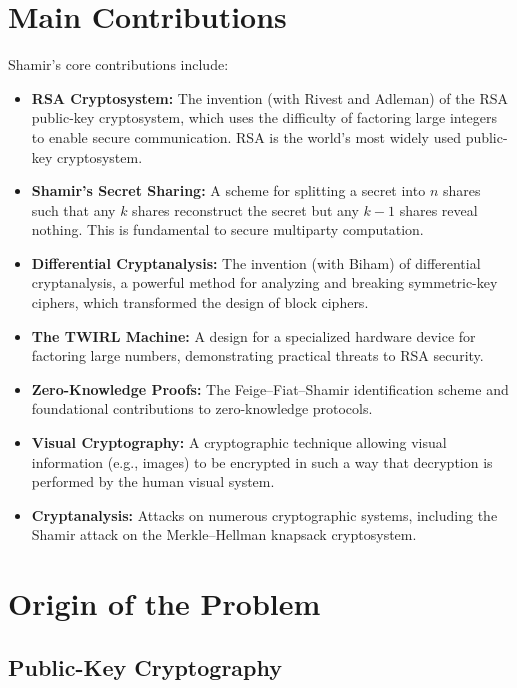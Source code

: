 \section{Main Contributions}

Shamir's core contributions include:
\begin{itemize}
    \item \textbf{RSA Cryptosystem:} The invention (with Rivest and Adleman) of the RSA public-key cryptosystem, which uses the difficulty of factoring large integers to enable secure communication. RSA is the world's most widely used public-key cryptosystem.
    \item \textbf{Shamir's Secret Sharing:} A scheme for splitting a secret into $n$ shares such that any $k$ shares reconstruct the secret but any $k-1$ shares reveal nothing. This is fundamental to secure multiparty computation.
    \item \textbf{Differential Cryptanalysis:} The invention (with Biham) of differential cryptanalysis, a powerful method for analyzing and breaking symmetric-key ciphers, which transformed the design of block ciphers.
    \item \textbf{The TWIRL Machine:} A design for a specialized hardware device for factoring large numbers, demonstrating practical threats to RSA security.
    \item \textbf{Zero-Knowledge Proofs:} The Feige--Fiat--Shamir identification scheme and foundational contributions to zero-knowledge protocols.
    \item \textbf{Visual Cryptography:} A cryptographic technique allowing visual information (e.g., images) to be encrypted in such a way that decryption is performed by the human visual system.
    \item \textbf{Cryptanalysis:} Attacks on numerous cryptographic systems, including the Shamir attack on the Merkle--Hellman knapsack cryptosystem.
\end{itemize}

\section{Origin of the Problem}

\subsection{Public-Key Cryptography}

